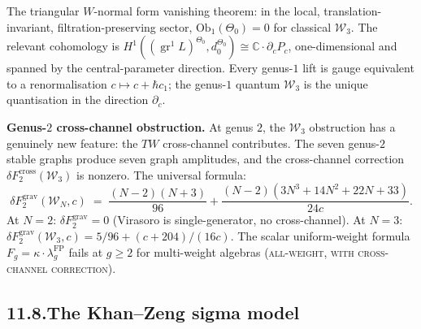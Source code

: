 \documentclass[11pt,reqno]{amsart}
\theoremstyle{definition}
\theoremstyle{remark}
\providecommand{\cW}{\mathcal{W}}
\providecommand{\bC}{\mathbb{C}}
\providecommand{\FP}{\mathrm{FP}}
\providecommand{\cross}{\mathrm{cross}}
\providecommand{\FP}{\mathrm{FP}}
\providecommand{\cross}{\mathrm{cross}}
\providecommand{\grav}{\mathrm{grav}}
\providecommand{\Ob}{\mathrm{Ob}}
\DeclareMathOperator{\gr}{gr}
\numberwithin{equation}{section}
\begin{document}
The triangular $W$-normal form vanishing theorem: in the local,
translation-invariant, filtration-preserving sector,
$\Ob_1(\Theta_0) = 0$ for classical $\cW_3$. The relevant
cohomology is
$H^1((\gr^1 L)^{\Theta_0}, d_0^{\Theta_0})
\cong \bC\cdot\partial_c P_c$,
one-dimensional and spanned by the central-parameter direction.
Every genus-$1$ lift is gauge equivalent to a renormalisation
$c \mapsto c + \hbar c_1$; the genus-$1$ quantum $\cW_3$ is the
unique quantisation in the direction $\partial_c$.

\medskip\noindent\textbf{Genus-$2$ cross-channel
obstruction.}\enspace
At genus $2$, the $\cW_3$ obstruction has a genuinely new
feature: the $TW$ cross-channel contributes. The seven
genus-$2$ stable graphs produce seven graph amplitudes, and the
cross-channel correction
$\delta F_2^{\cross}(\cW_3)$ is nonzero. The universal formula:
\[
\delta F_2^{\grav}(\cW_N, c)
\;=\;
\frac{(N-2)(N+3)}{96}
+ \frac{(N-2)(3N^3 + 14N^2 + 22N + 33)}{24c}.
\]
At $N = 2$: $\delta F_2^{\grav} = 0$ (Virasoro is single-generator,
no cross-channel). At $N = 3$:
$\delta F_2^{\grav}(\cW_3, c) = 5/96 + (c + 204)/(16c)$.
The scalar uniform-weight formula
$F_g = \kappa \cdot \lambda_g^{\FP}$ fails at $g \ge 2$ for
multi-weight algebras \textsc{(all-weight, with cross-channel
correction)}.

\subsection*{11.8.\enspace The Khan--Zeng sigma model}
\end{document}
